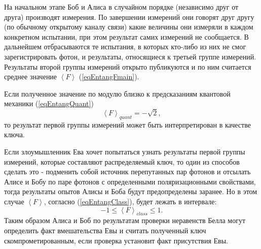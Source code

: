 На начальном этапе Боб и Алиса в случайном порядке (независимо друг от
друга) производят измерения. По завершении измерений они говорят друг
другу (по обычному открытому каналу связи) какие величины они измеряли
в каждом конкретном испытании, при этом результат самих измерений не
сообщается. В дальнейшем отбрасываются те испытания, в которых кто-либо
из них не смог зарегистрировать фотон, и результаты, относящиеся к
третьей группе измерений. Результаты второй группы измерений открыто
публикуются и по ним считается среднее значение $\left<F\right>$
(\ref{eqEntangFmain}). 

Если полученное значение по модулю близко к предсказаниям квантовой
механики (\ref{eqEntangQuant})
\[
\left<F\right>_{quant} = - \sqrt{2},
\]
то результат первой группы измерений может быть
интерпретирован в качестве ключа. 

Если злоумышленник Ева хочет попытаться узнать результаты первой
группы измерений, которые составляют распределяемый ключ, то
один из способов сделать это - подменить собой источник
перепутанных пар фотонов и отсылать Алисе и Бобу по паре фотонов с
определенными поляризационными свойствами, тогда результаты
опытов Алисы и Боба будут предопределены заранее. Но в этом случае
$\left<F\right>$, согласно (\ref{eqEntangClass}), будет лежать в
интервале:
\[
-1 \le \left<F\right>_{class} \le 1.
\]
Таким образом Алиса и Боб по результатам проверки неравенств Белла
могут определить факт вмешательства Евы и считать полученный
ключ скомпрометированным, если проверка установит факт присутствия Евы.

